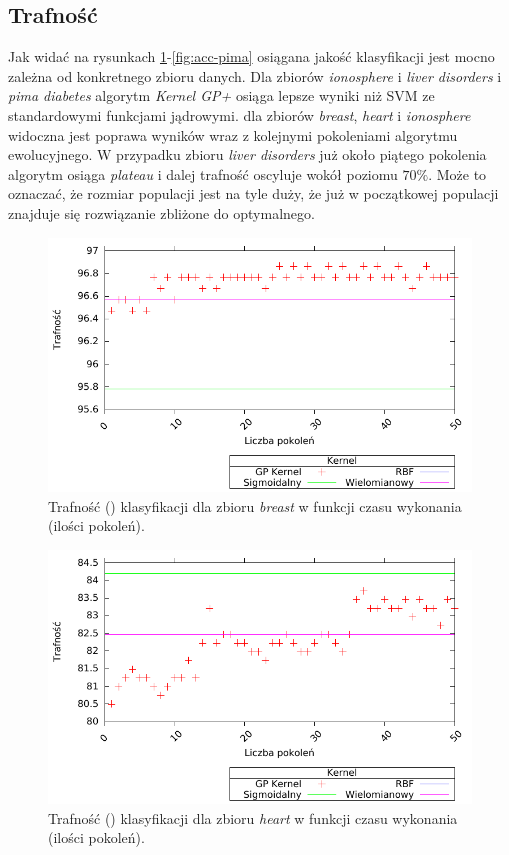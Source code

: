 \subsection{Trafność}
	
	Jak widać na rysunkach \ref{fig:acc-breast}-\ref{fig:acc-pima} osiągana jakość klasyfikacji jest mocno zależna od konkretnego zbioru danych. Dla zbiorów \emph{ionosphere} i \emph{liver disorders} i \emph{pima diabetes} algorytm \emph{Kernel GP+} osiąga lepsze wyniki niż SVM ze standardowymi funkcjami jądrowymi. dla zbiorów \emph{breast}, \emph{heart} i \emph{ionosphere} widoczna jest poprawa wyników wraz z kolejnymi pokoleniami algorytmu ewolucyjnego. W przypadku zbioru \emph{liver disorders} już około piątego pokolenia algorytm osiąga \emph{plateau} i dalej trafność oscyluje wokół poziomu $ 70\% $. Może to oznaczać, że rozmiar populacji jest na tyle duży, że już w początkowej populacji znajduje się rozwiązanie zbliżone do optymalnego.
	
	\begin{figure}
		\includegraphics[scale=0.90]{figures/results/accuracy/accuracy-breast}
		\caption{Trafność () klasyfikacji dla zbioru \emph{breast} w funkcji czasu wykonania (ilości pokoleń).\label{fig:acc-breast}}
	\end{figure}
	
	\begin{figure}
		\includegraphics[scale=0.90]{figures/results/accuracy/accuracy-heart}
		\caption{Trafność () klasyfikacji dla zbioru \emph{heart} w funkcji czasu wykonania (ilości pokoleń).\label{fig:acc-heart}}
	\end{figure}
	
